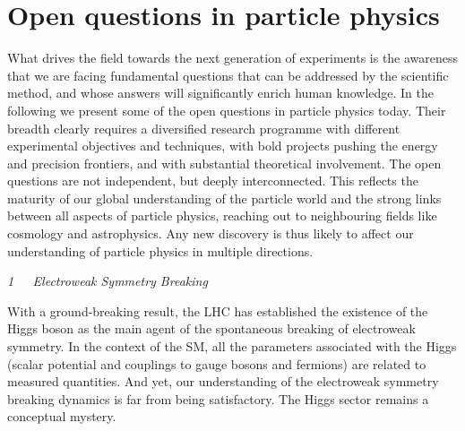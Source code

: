 \documentclass[../report.tex]{subfiles}
\begin{document}
\section*{Open questions in particle physics}

 What drives the field towards the next generation of experiments is the awareness that we are facing fundamental questions that can be addressed by the scientific method,  and whose answers will significantly enrich human knowledge. 
 In the following we present some of the open questions in particle physics today. 
  Their breadth clearly requires 
  a diversified research programme with different experimental objectives and techniques, with bold projects pushing the energy and precision frontiers, and with substantial theoretical involvement. The open questions 
  are not independent, but deeply interconnected. This reflects the maturity of our global understanding of the particle world and the strong links between all aspects of particle physics, reaching out to neighbouring fields like cosmology and astrophysics. 
  Any new discovery is thus likely to affect our understanding of particle physics in multiple directions.

\medskip\noindent 
{\it 1~~~Electroweak Symmetry Breaking}

\smallskip \noindent
 With a ground-breaking result, the LHC has established the existence of the Higgs boson as the main agent of the spontaneous breaking of electroweak symmetry. In the context of the SM, all the parameters associated with the Higgs (scalar potential and couplings to gauge bosons and fermions) are 
 related to measured quantities. And yet, our understanding of the electroweak symmetry breaking dynamics is far from being satisfactory. The Higgs sector remains a conceptual mystery. 
\end{document}

